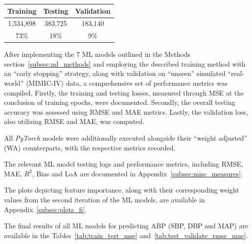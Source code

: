 \begin{center}
    \begin{tabular}{|c|c|c|}
        \hline
        Training  & Testing & Validation \\
        \hline
        1,534,898 & 383,725 & 183,140    \\
        \hline
        73\%      & 18\%    & 9\%        \\
        \hline
    \end{tabular}
\end{center}

After implementing the 7 ML models outlined in the Methods section~\ref{subsec:ml_methods} and employing the described training method with an \enquote{early stopping} strategy,
along with validation on \enquote{unseen} simulated \enquote{real-world} (MIMIC-IV) data, a comprehensive set of performance metrics was compiled.
Firstly, the training and testing losses, measured through MSE at the conclusion of training epochs, were documented.
Secondly, the overall testing accuracy was assessed using RMSE and MAE metrics.
Lastly, the validation loss, also utilizing RMSE and MAE, was computed.

All \textit{PyTorch} models were additionally executed alongside their \enquote{weight adjusted} (WA) counterparts, with the respective metrics recorded.

The relevant ML model testing logs and performance metrics, including RMSE, MAE, \textit{$R^2$}, Bias and LoA are documented in Appendix~\ref{subsec:misc_measures}.

The plots depicting feature importance, along with their corresponding weight values from the second iteration of the ML models, are available in Appendix~\ref{subsec:plots_fi}.

The final results of all ML models for predicting ABP (SBP, DBP and MAP) are available in the Tables~\ref{tab:train_test_mse} and~\ref{tab:test_validate_rmse_mae}.

